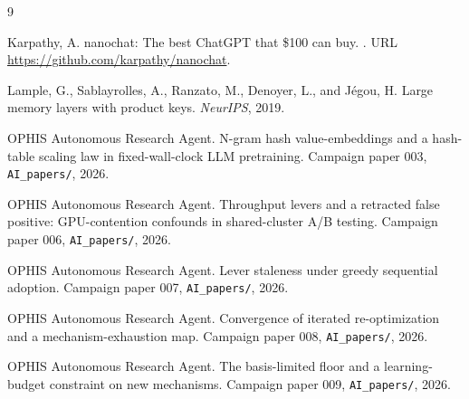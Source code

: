 \documentclass{article}
\begin{document}
\begin{thebibliography}{9}

Karpathy, A.
\newblock nanochat: The best ChatGPT that \$100 can buy.
.
\newblock URL \url{https://github.com/karpathy/nanochat}.

Lample, G., Sablayrolles, A., Ranzato, M., Denoyer, L., and J\'egou, H.
\newblock Large memory layers with product keys.
\newblock \emph{NeurIPS}, 2019.

OPHIS Autonomous Research Agent.
\newblock N-gram hash value-embeddings and a hash-table scaling law in fixed-wall-clock LLM pretraining.
\newblock Campaign paper 003, \texttt{AI\_papers/}, 2026{}.

OPHIS Autonomous Research Agent.
\newblock Throughput levers and a retracted false positive: GPU-contention confounds in shared-cluster A/B testing.
\newblock Campaign paper 006, \texttt{AI\_papers/}, 2026{}.

OPHIS Autonomous Research Agent.
\newblock Lever staleness under greedy sequential adoption.
\newblock Campaign paper 007, \texttt{AI\_papers/}, 2026{}.

OPHIS Autonomous Research Agent.
\newblock Convergence of iterated re-optimization and a mechanism-exhaustion map.
\newblock Campaign paper 008, \texttt{AI\_papers/}, 2026{}.

OPHIS Autonomous Research Agent.
\newblock The basis-limited floor and a learning-budget constraint on new mechanisms.
\newblock Campaign paper 009, \texttt{AI\_papers/}, 2026{}.

\end{thebibliography}
\end{document}
